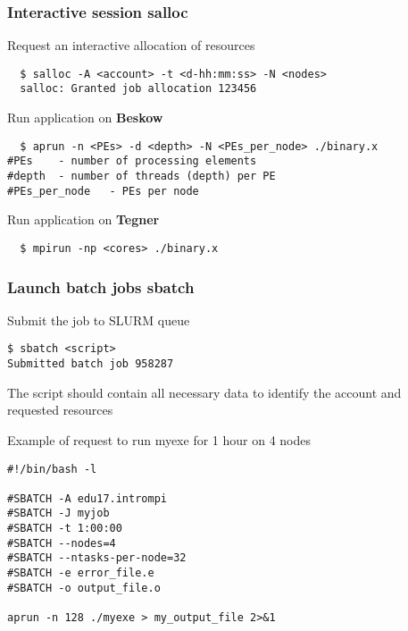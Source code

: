 \begin{frame}[fragile]
\frametitle{Interactive session \hfill \alert{\textbf{salloc}}}

\begin{exampleblock}{Request an interactive allocation of resources}
  \begin{verbatim}
  $ salloc -A <account> -t <d-hh:mm:ss> -N <nodes>
  salloc: Granted job allocation 123456
   \end{verbatim}
\end{exampleblock}

\begin{exampleblock}{Run application on \alert{\textbf{Beskow}}}
  \begin{verbatim}
  $ aprun -n <PEs> -d <depth> -N <PEs_per_node> ./binary.x
#PEs 	- number of processing elements
#depth 	- number of threads (depth) per PE
#PEs_per_node 	- PEs per node
  \end{verbatim}
\end{exampleblock}
  
  
\begin{exampleblock}{Run application on \alert{\textbf{Tegner}}}

  \begin{verbatim}
  $ mpirun -np <cores> ./binary.x
  \end{verbatim}
\end{exampleblock}
\end{frame}

\begin{frame}[fragile]
\frametitle{Launch batch jobs \hfill  \alert{\textbf{sbatch}}}
\begin{exampleblock}{Submit the job to SLURM queue}
  \begin{verbatim}
$ sbatch <script>
Submitted batch job 958287
  \end{verbatim}
\end{exampleblock}

\scriptsize
The script should contain all necessary data to identify the account and requested resources 
\begin{exampleblock}{Example of request to run myexe for 1 hour on 4 nodes}
  \begin{verbatim}
#!/bin/bash -l

#SBATCH -A edu17.intrompi
#SBATCH -J myjob
#SBATCH -t 1:00:00
#SBATCH --nodes=4
#SBATCH --ntasks-per-node=32
#SBATCH -e error_file.e
#SBATCH -o output_file.o

aprun -n 128 ./myexe > my_output_file 2>&1
  \end{verbatim}
\end{exampleblock}

\end{frame}

